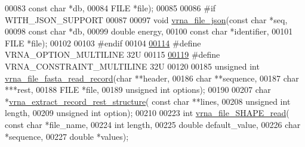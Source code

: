 \begin{DoxyCode}
00083                       \textcolor{keyword}{const} \textcolor{keywordtype}{char} *db,
00084                       FILE *file);
00085 
00086 \textcolor{preprocessor}{#if WITH\_JSON\_SUPPORT}
00087 
00097 \textcolor{keywordtype}{void} \hyperlink{group__file__utils_ga31f4a6c2ea1495a6e4f9eb45a9f6193d}{vrna\_file\_json}(\textcolor{keyword}{const} \textcolor{keywordtype}{char} *seq,
00098                     \textcolor{keyword}{const} \textcolor{keywordtype}{char} *db,
00099                     \textcolor{keywordtype}{double} energy,
00100                     \textcolor{keyword}{const} \textcolor{keywordtype}{char} *identifier,
00101                     FILE *file);
00102 
00103 \textcolor{preprocessor}{#endif}
00104 
\hypertarget{file__formats_8h_source.tex_l00114}{}\hyperlink{group__file__utils_gabec89c09874528c6cb73140a4c3d86d7}{00114} \textcolor{preprocessor}{#define VRNA\_OPTION\_MULTILINE             32U}
00115 
\hypertarget{file__formats_8h_source.tex_l00119}{}\hyperlink{group__file__utils_ga7d725ef525b29891abef3f1ed42599a4}{00119} \textcolor{preprocessor}{#define VRNA\_CONSTRAINT\_MULTILINE         32U}
00120 
00185 \textcolor{keywordtype}{unsigned} \textcolor{keywordtype}{int} \hyperlink{group__file__utils_ga8cfb7e271efc9e1f34640acb85475639}{vrna\_file\_fasta\_read\_record}(\textcolor{keywordtype}{char} **header,
00186                                     \textcolor{keywordtype}{char} **sequence,
00187                                     \textcolor{keywordtype}{char}  ***rest,
00188                                     FILE *file,
00189                                     \textcolor{keywordtype}{unsigned} \textcolor{keywordtype}{int} options);
00190 
00207 \textcolor{keywordtype}{char} *\hyperlink{group__file__utils_gad37cbb63a05eed63ba25c91628409be0}{vrna\_extract\_record\_rest\_structure}( \textcolor{keyword}{const} \textcolor{keywordtype}{char} **lines,
00208                                           \textcolor{keywordtype}{unsigned} \textcolor{keywordtype}{int} length,
00209                                           \textcolor{keywordtype}{unsigned} \textcolor{keywordtype}{int} option);
00210 
00223 \textcolor{keywordtype}{int} \hyperlink{group__file__utils_ga646ebf45450a69a7f2533f9ecd283a32}{vrna\_file\_SHAPE\_read}( \textcolor{keyword}{const} \textcolor{keywordtype}{char} *file\_name,
00224                           \textcolor{keywordtype}{int} length,
00225                           \textcolor{keywordtype}{double} default\_value,
00226                           \textcolor{keywordtype}{char} *sequence,
00227                           \textcolor{keywordtype}{double} *values);

\end{DoxyCode}
